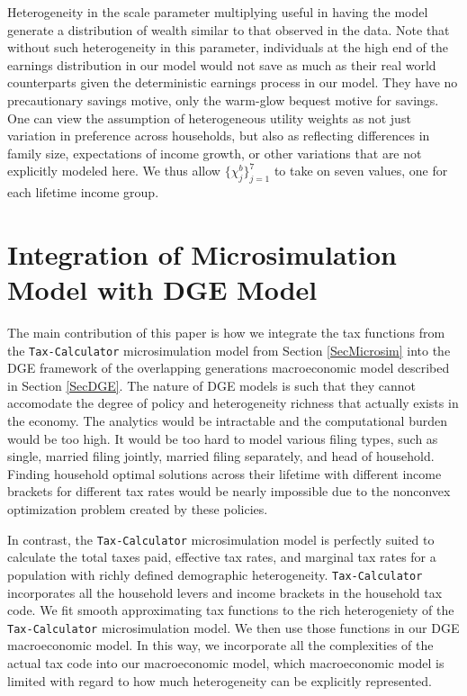 \documentclass[letterpaper,12pt]{article}
\theoremstyle{definition}
\begin{document}
\begin{spacing}{1.5}
    Heterogeneity in the scale parameter multiplying useful in having the model generate a distribution of wealth similar to that observed in the data.  Note that without such heterogeneity in this parameter, individuals at the high end of the earnings distribution in our model would not save as much as their real world counterparts given the deterministic earnings process in our model. They have no precautionary savings motive, only the warm-glow bequest motive for savings.  One can view the assumption of heterogeneous utility weights as not just variation in preference across households, but also as reflecting differences in family size, expectations of income growth, or other variations that are not explicitly modeled here.  We thus allow  $\{\chi^b_j\}_{j=1}^7$ to take on seven values, one for each lifetime income group.


\section{Integration of Microsimulation Model with DGE Model}\label{SecIntegr}

  The main contribution of this paper is how we integrate the tax functions from the \texttt{Tax-Calculator} microsimulation model from Section \ref{SecMicrosim} into the DGE framework of the overlapping generations macroeconomic model described in Section \ref{SecDGE}. The nature of DGE models is such that they cannot accomodate the degree of policy and heterogeneity richness that actually exists in the economy. The analytics would be intractable and the computational burden would be too high. It would be too hard to model various filing types, such as single, married filing jointly, married filing separately, and head of household. Finding household optimal solutions across their lifetime with different income brackets for different tax rates would be nearly impossible due to the nonconvex optimization problem created by these policies.

  In contrast, the \texttt{Tax-Calculator} microsimulation model is perfectly suited to calculate the total taxes paid, effective tax rates, and marginal tax rates for a population with richly defined demographic heterogeneity. \texttt{Tax-Calculator} incorporates all the household levers and income brackets in the household tax code. We fit smooth approximating tax functions to the rich heterogeniety of the \texttt{Tax-Calculator} microsimulation model. We then use those functions in our DGE macroeconomic model. In this way, we incorporate all the complexities of the actual tax code into our macroeconomic model, which macroeconomic model is limited with regard to how much heterogeneity can be explicitly represented.


\end{spacing}
\end{document}
